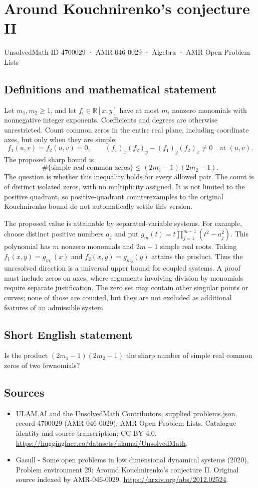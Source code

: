 \documentclass[11pt,a4paper]{article}
\begin{document}
\section*{Around Kouchnirenko's conjecture II}\label{4700029}
{\small UnsolvedMath ID 4700029 · AMR-046-0029 · Algebra · AMR Open Problem Lists}
\subsection{Definitions and mathematical statement}
Let $m_1,m_2\ge1$, and let $f_i\in\mathbb R[x,y]$ have at most $m_i$
nonzero monomials with nonnegative integer exponents. Coefficients and
degrees are otherwise unrestricted. Count common zeros in the entire
real plane, including coordinate axes, but only when they are simple:
\[
 f_1(u,v)=f_2(u,v)=0,\qquad
 (f_1)_x(f_2)_y-(f_1)_y(f_2)_x\ne0
 \quad\text{at }(u,v).
\]
The proposed sharp bound is
\[
 \#\{\text{simple real common zeros}\}
       \le(2m_1-1)(2m_2-1).
\]
The question is whether this inequality holds for every allowed pair.
The count is of distinct isolated zeros, with no multiplicity assigned.
It is not limited to the positive quadrant, so positive-quadrant
counterexamples to the original Kouchnirenko bound do not automatically
settle this version.

The proposed value is attainable by separated-variable systems. For
example, choose distinct positive numbers $a_j$ and put
$g_m(t)=t\prod_{j=1}^{m-1}(t^2-a_j^2)$. This polynomial has $m$
nonzero monomials and $2m-1$ simple real roots. Taking
$f_1(x,y)=g_{m_1}(x)$ and $f_2(x,y)=g_{m_2}(y)$ attains the product.
Thus the unresolved direction is a universal upper bound for coupled
systems. A proof must include zeros on axes, where arguments involving
division by monomials require separate justification. The zero set may
contain other singular points or curves; none of those are counted, but
they are not excluded as additional features of an admissible system.
\subsection{Short English statement}
Is the product $(2m_1-1)(2m_2-1)$ the sharp number of simple real common zeros of two fewnomials?
\subsection{Sources}
\begin{itemize}
\item[S1] ULAM.AI and the UnsolvedMath Contributors, supplied problems.json, record 4700029 (AMR-046-0029), AMR Open Problem Lists. Catalogue identity and source transcription; CC BY 4.0.
\url{https://huggingface.co/datasets/ulamai/UnsolvedMath}.
\item[S2] Gasull - Some open problems in low dimensional dynamical systems (2020), Problem environment 29: Around Kouchnirenko's conjecture II. Original source indexed by AMR-046-0029.
\url{https://arxiv.org/abs/2012.02524}.
\end{itemize}
\end{document}
